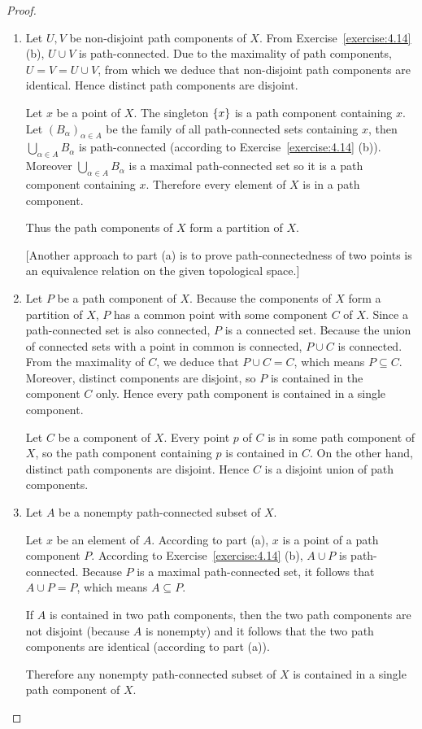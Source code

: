 \begin{proof}
	\begin{enumerate}[label={(\alph*)}]
		\item Let $U, V$ be non-disjoint path components of $X$. From Exercise~\ref{exercise:4.14} (b), $U\cup V$ is path-connected. Due to the maximality of path components, $U = V = U\cup V$, from which we deduce that non-disjoint path components are identical. Hence distinct path components are disjoint.

		      Let $x$ be a point of $X$. The singleton $\left\{{x}\right\}$ is a path component containing $x$. Let ${(B_{\alpha})}_{\alpha\in A}$ be the family of all path-connected sets containing $x$, then $\bigcup_{\alpha\in A}B_{\alpha}$ is path-connected (according to Exercise~\ref{exercise:4.14} (b)). Moreover $\bigcup_{\alpha\in A}B_{\alpha}$ is a maximal path-connected set so it is a path component containing $x$. Therefore every element of $X$ is in a path component.

		      Thus the path components of $X$ form a partition of $X$.

			      [Another approach to part (a) is to prove path-connectedness of two points is an equivalence relation on the given topological space.]
		\item Let $P$ be a path component of $X$. Because the components of $X$ form a partition of $X$, $P$ has a common point with some component $C$ of $X$. Since a path-connected set is also connected, $P$ is a connected set. Because the union of connected sets with a point in common is connected, $P\cup C$ is connected. From the maximality of $C$, we deduce that $P\cup C = C$, which means $P\subseteq C$. Moreover, distinct components are disjoint, so $P$ is contained in the component $C$ only. Hence every path component is contained in a single component.

		      Let $C$ be a component of $X$. Every point $p$ of $C$ is in some path component of $X$, so the path component containing $p$ is contained in $C$. On the other hand, distinct path components are disjoint. Hence $C$ is a disjoint union of path components.
		\item Let $A$ be a nonempty path-connected subset of $X$.

		      Let $x$ be an element of $A$. According to part (a), $x$ is a point of a path component $P$. According to Exercise~\ref{exercise:4.14} (b), $A\cup P$ is path-connected. Because $P$ is a maximal path-connected set, it follows that $A\cup P = P$, which means $A\subseteq P$.

		      If $A$ is contained in two path components, then the two path components are not disjoint (because $A$ is nonempty) and it follows that the two path components are identical (according to part (a)).

		      Therefore any nonempty path-connected subset of $X$ is contained in a single path component of $X$.
	\end{enumerate}
\end{proof}

